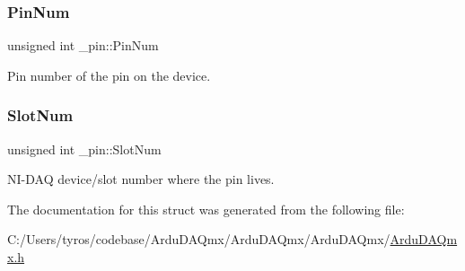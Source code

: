 \subsubsection{\texorpdfstring{Pin\+Num}{PinNum}}
{\footnotesize\ttfamily unsigned int \+\_\+pin\+::\+Pin\+Num}

Pin number of the pin on the device. \mbox{\label{struct__pin_a8eb63758b00d61d9b187c101f899fcb2}} 
\subsubsection{\texorpdfstring{Slot\+Num}{SlotNum}}
{\footnotesize\ttfamily unsigned int \+\_\+pin\+::\+Slot\+Num}

N\+I-\/\+D\+AQ device/slot number where the pin lives. 

The documentation for this struct was generated from the following file\+:\begin{DoxyCompactItemize}
\item 
C\+:/\+Users/tyros/codebase/\+Ardu\+D\+A\+Qmx/\+Ardu\+D\+A\+Qmx/\+Ardu\+D\+A\+Qmx/\mbox{\hyperlink{_ardu_d_a_qmx_8h}{Ardu\+D\+A\+Qmx.\+h}}\end{DoxyCompactItemize}
